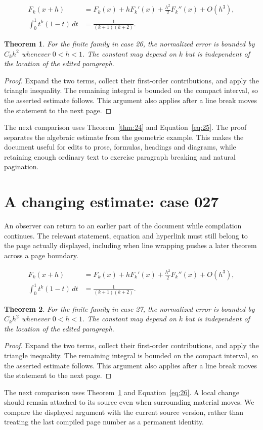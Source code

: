 \documentclass[a4paper,10pt]{article}
\newtheorem{theorem}{Theorem}[section]
\begin{document}
\lipsum[16-17]
\begin{align}\label{eq:25}
 F_k(x+h)&=F_k(x)+hF_k'(x)+\frac{h^2}{2}F_k''(x)+O(h^3),\\
 \int_0^1 t^k(1-t)\,dt&=\frac{1}{(k+1)(k+2)}.
\end{align}
\begin{theorem}\label{thm:25}
For the finite family in case 26, the normalized error is bounded by $C_k h^2$ whenever $0<h<1$. The constant may depend on $k$ but is independent of the location of the edited paragraph.
\end{theorem}
\begin{proof}
Expand the two terms, collect their first-order contributions, and apply the
triangle inequality. The remaining integral is bounded on the compact interval,
so the asserted estimate follows. This argument also applies after a line break
moves the statement to the next page.
\end{proof}
The next comparison uses Theorem~\ref{thm:24} and Equation~\ref{eq:25}. The proof separates the algebraic estimate from the geometric example. This makes the document useful for edits to prose, formulas, headings and diagrams, while retaining enough ordinary text to exercise paragraph breaking and natural pagination.

\lipsum[3]

\section{A changing estimate: case 027}\label{unit:26}
An observer can return to an earlier part of the document while compilation continues. The relevant statement, equation and hyperlink must still belong to the page actually displayed, including when line wrapping pushes a later theorem across a page boundary.

\lipsum[19-20]
\begin{align}\label{eq:26}
 F_k(x+h)&=F_k(x)+hF_k'(x)+\frac{h^2}{2}F_k''(x)+O(h^3),\\
 \int_0^1 t^k(1-t)\,dt&=\frac{1}{(k+1)(k+2)}.
\end{align}
\begin{theorem}\label{thm:26}
For the finite family in case 27, the normalized error is bounded by $C_k h^2$ whenever $0<h<1$. The constant may depend on $k$ but is independent of the location of the edited paragraph.
\end{theorem}
\begin{proof}
Expand the two terms, collect their first-order contributions, and apply the
triangle inequality. The remaining integral is bounded on the compact interval,
so the asserted estimate follows. This argument also applies after a line break
moves the statement to the next page.
\end{proof}
The next comparison uses Theorem~\ref{thm:25} and Equation~\ref{eq:26}. A local change should remain attached to its source even when surrounding material moves. We compare the displayed argument with the current source version, rather than treating the last compiled page number as a permanent identity.
\end{document}
